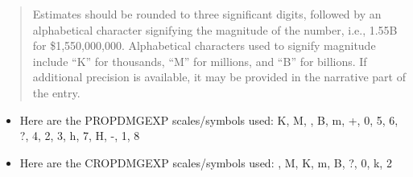 \documentclass[]{article}
\begin{document}
\begin{quote}
Estimates should be rounded to three significant digits, followed by an
alphabetical character signifying the magnitude of the number, i.e.,
1.55B for \$1,550,000,000. Alphabetical characters used to signify
magnitude include ``K'' for thousands, ``M'' for millions, and ``B'' for
billions. If additional precision is available, it may be provided in
the narrative part of the entry.
\end{quote}

\begin{itemize}
\item
  Here are the PROPDMGEXP scales/symbols used: K, M, , B, m, +, 0, 5, 6,
  ?, 4, 2, 3, h, 7, H, -, 1, 8
\item
  Here are the CROPDMGEXP scales/symbols used: , M, K, m, B, ?, 0, k, 2
\end{itemize}
\end{document}
